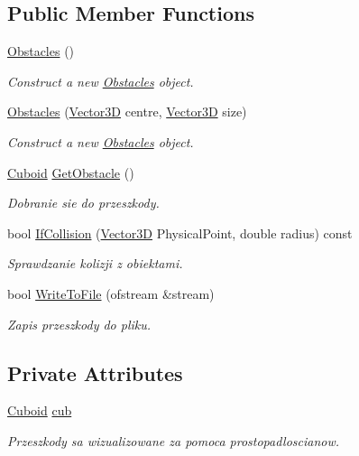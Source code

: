 \subsection*{Public Member Functions}
\begin{DoxyCompactItemize}
\item 
\hyperlink{class_obstacles_a51c7f97c28a251ab75d711b23d9fe8e1}{Obstacles} ()
\begin{DoxyCompactList}\small\item\em Construct a new \hyperlink{class_obstacles}{Obstacles} object. \end{DoxyCompactList}\item 
\hyperlink{class_obstacles_a28b7f32500e1e58465ef5dc9e2d63ec1}{Obstacles} (\hyperlink{vector3_d_8hh_a8790ef07836c1639da216f46501979c0}{Vector3D} centre, \hyperlink{vector3_d_8hh_a8790ef07836c1639da216f46501979c0}{Vector3D} size)
\begin{DoxyCompactList}\small\item\em Construct a new \hyperlink{class_obstacles}{Obstacles} object. \end{DoxyCompactList}\item 
\hyperlink{class_cuboid}{Cuboid} \hyperlink{class_obstacles_aacee9a8a19128a528e2b236485030128}{Get\+Obstacle} ()
\begin{DoxyCompactList}\small\item\em Dobranie sie do przeszkody. \end{DoxyCompactList}\item 
bool \hyperlink{class_obstacles_a873ae714db7bf22195867aed06e72227}{If\+Collision} (\hyperlink{vector3_d_8hh_a8790ef07836c1639da216f46501979c0}{Vector3D} Physical\+Point, double radius) const 
\begin{DoxyCompactList}\small\item\em Sprawdzanie kolizji z obiektami. \end{DoxyCompactList}\item 
bool \hyperlink{class_obstacles_a41b1c2255c6230514fb6a91afb5f8f7b}{Write\+To\+File} (ofstream \&stream)
\begin{DoxyCompactList}\small\item\em Zapis przeszkody do pliku. \end{DoxyCompactList}\end{DoxyCompactItemize}
\subsection*{Private Attributes}
\begin{DoxyCompactItemize}
\item 
\hyperlink{class_cuboid}{Cuboid} \hyperlink{class_obstacles_a524ef2c37e9160887bd20780d68cff76}{cub}
\begin{DoxyCompactList}\small\item\em Przeszkody sa wizualizowane za pomoca prostopadloscianow. \end{DoxyCompactList}\end{DoxyCompactItemize}
